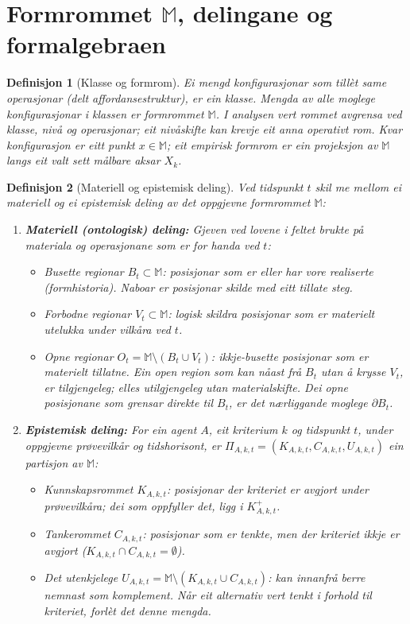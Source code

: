 \documentclass[9pt,twocolumn,a4paper]{article}
\theoremstyle{defstyle}
\newtheorem{definisjon}{Definisjon}
\theoremstyle{formstyle}
\begin{document}
\section{Formrommet $\mathbb{M}$, delingane og formalgebraen}

\begin{definisjon}[Klasse og formrom]
Ei mengd konfigurasjonar som tillèt same operasjonar (delt \emph{affordansestruktur}), er ein \emph{klasse}. Mengda av alle moglege konfigurasjonar i klassen er \emph{formrommet} $\mathbb{M}$. I analysen vert rommet avgrensa ved klasse, nivå og operasjonar; eit nivåskifte kan krevje eit anna operativt rom. Kvar konfigurasjon er eitt punkt $x \in \mathbb{M}$; eit empirisk formrom er ein projeksjon av $\mathbb{M}$ langs eit valt sett målbare aksar $X_k$.
\end{definisjon}

\begin{definisjon}[Materiell og epistemisk deling]
Ved tidspunkt $t$ skil me mellom ei materiell og ei epistemisk deling av det oppgjevne formrommet $\mathbb{M}$:
\begin{enumerate}
\item \textbf{Materiell (ontologisk) deling:} Gjeven ved lovene i feltet brukte på materiala og operasjonane som er for handa ved $t$:
\begin{itemize}
\item \emph{Busette regionar} $B_t \subset \mathbb{M}$: posisjonar som er eller har vore realiserte (\emph{formhistoria}). Naboar er posisjonar skilde med eitt tillate steg.
\item \emph{Forbodne regionar} $V_t \subset \mathbb{M}$: logisk skildra posisjonar som er materielt utelukka under vilkåra ved $t$.
\item \emph{Opne regionar} $O_t = \mathbb{M} \setminus (B_t \cup V_t)$: ikkje-busette posisjonar som er materielt tillatne. Ein open region som kan nåast frå $B_t$ utan å krysse $V_t$, er \emph{tilgjengeleg}; elles \emph{utilgjengeleg} utan materialskifte. Dei opne posisjonane som grensar direkte til $B_t$, er \emph{det nærliggande moglege} $\partial B_t$.
\end{itemize}
\item \textbf{Epistemisk deling:} For ein agent $A$, eit kriterium $k$ og tidspunkt $t$, under oppgjevne prøvevilkår og tidshorisont, er $\Pi_{A,k,t} = (K_{A,k,t}, C_{A,k,t}, U_{A,k,t})$ ein partisjon av $\mathbb{M}$:
\begin{itemize}
\item \emph{Kunnskapsrommet} $K_{A,k,t}$: posisjonar der kriteriet er avgjort under prøvevilkåra; dei som oppfyller det, ligg i $K_{A,k,t}^{+}$.
\item \emph{Tankerommet} $C_{A,k,t}$: posisjonar som er tenkte, men der kriteriet ikkje er avgjort ($K_{A,k,t} \cap C_{A,k,t} = \emptyset$).
\item \emph{Det utenkjelege} $U_{A,k,t} = \mathbb{M} \setminus (K_{A,k,t} \cup C_{A,k,t})$: kan innanfrå berre nemnast som komplement. Når eit alternativ vert tenkt i forhold til kriteriet, forlèt det denne mengda.
\end{itemize}
\end{enumerate}
\end{definisjon}
\end{document}
